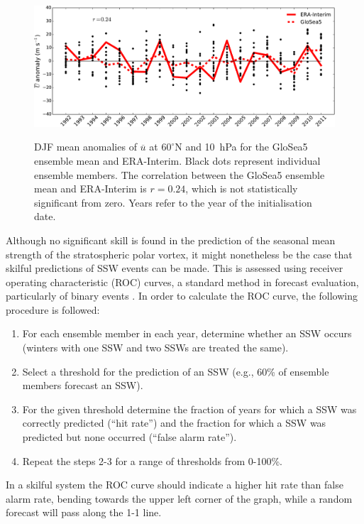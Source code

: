 \begin{figure}[t]
  \noindent\includegraphics[width=\textwidth,angle=0]{figures/chapter-seasonal/DJF_ZMZW_NH.pdf}\\
  \caption[DJF $\overline{u}$ anomalies for GloSea5.]{DJF mean anomalies of
    $\overline{u}$ at $60^{\circ}$N and 10~hPa for the GloSea5 ensemble mean and
    ERA-Interim. Black dots represent individual ensemble members. The
    correlation between the GloSea5 ensemble mean and ERA-Interim is $r=0.24$,
    which is not statistically significant from zero. Years refer to the year of
    the initialisation date.}\label{fig:nh_zmzw_timeseries}
\end{figure}

Although no significant skill is found in the prediction of the seasonal mean
strength of the stratospheric polar vortex, it might nonetheless be the case
that skilful predictions of SSW events can be made. This is assessed using
receiver operating characteristic (ROC) curves, a standard method in forecast
evaluation, particularly of binary events \citep[e.g.,][]{Wilks}. In order to
calculate the ROC curve, the following procedure is followed:
\begin{enumerate}[1.]
\item For each ensemble member in each year, determine whether an SSW occurs
  (winters with one SSW and two SSWs are treated the same). 
\item Select a threshold for the prediction of an SSW (e.g., 60\% of ensemble
  members forecast an SSW). 
\item For the given threshold determine the fraction of years for which a SSW
  was correctly predicted (``hit rate'') and the fraction for which a SSW was
  predicted but none occurred (``false alarm rate''). 
\item Repeat the steps 2-3 for a range of thresholds from 0-100\%.
\end{enumerate}
In a skilful system the ROC curve should indicate a higher hit rate than false
alarm rate, bending towards the upper left corner of the graph, while a random
forecast will pass along the 1-1 line. 


